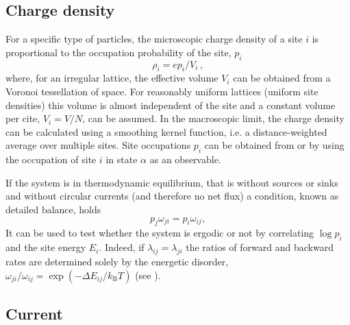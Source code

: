 \subsection{Charge density}
For a specific type of particles, the microscopic charge density of a site $i$ is proportional to the occupation probability of the site, $p_i$
\begin{equation}
 \rho_i = e p_i / V_i\, ,
\end{equation}
where,  for an irregular lattice, the effective volume $V_i$ can be obtained from a Voronoi tessellation of space. For reasonably uniform lattices (uniform site densities) this volume is almost independent of the site and a constant volume per cite, $V_i = V/N$, can be assumed.  In the macroscopic limit, the charge density can be calculated using a smoothing kernel function, i.e. a distance-weighted average over multiple sites. Site occupations $p_i$ can be obtained from  or   by using the occupation of site $i$ in state $\alpha$ as an observable.

If the system is in thermodynamic equilibrium, that is without sources or sinks and without circular currents (and therefore no net flux) a condition, known as detailed balance, holds
%
\begin{equation}
\label{equ:detailed_balance}
  p_j \omega_{ji} = p_i \omega_{ij},
\end{equation}
%
It can be used to test whether the system is ergodic or not by correlating $\log p_i$ and the site energy $E_i$. Indeed, if $\lambda_{ij} = \lambda_{ji}$ the ratios of forward and backward rates are determined solely by the energetic disorder, $\omega_{ji} / \omega_{ij} = \exp(-\Delta E_{ij} / k_\text{B} T)$ (see ).

\subsection{Current}
\label{sec:vaverage}

